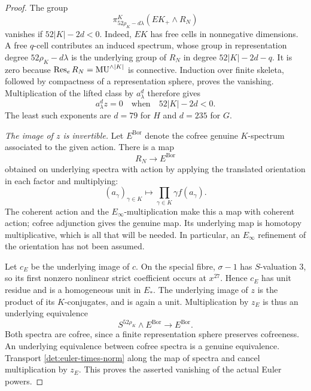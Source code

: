 \begin{proof}
The group
\[
 \pi_{52\rho_K-d\lambda}^K(EK_+\wedge R_N)
\]
vanishes if \(52|K|-2d<0\).
Indeed, \(EK\) has free cells in nonnegative dimensions.
A free \(q\)-cell contributes an induced spectrum, whose
group in representation degree \(52\rho_K-d\lambda\) is
the underlying group of \(R_N\) in degree
\(52|K|-2d-q\).  It is zero because
\(\operatorname{Res}_eR_N=\mathrm{MU}^{\wedge |K|}\) is connective.
Induction over finite skeleta, followed by compactness of a
representation sphere, proves the vanishing.
Multiplication of the lifted class by \(a_\lambda^d\)
therefore gives
\begin{equation}\label{det:euler-times-norm}
 a_\lambda^d z=0
 \quad\text{when}\quad 52|K|-2d<0.
\end{equation}
The least such exponents are \(d=79\) for \(H\) and
\(d=235\) for \(G\).

\emph{The image of \(z\) is invertible.}
Let \(E^{\mathrm{Bor}}\) denote the cofree genuine
\(K\)-spectrum associated to the given action.
There is a map
\[
 R_N\longrightarrow E^{\mathrm{Bor}}
\]
obtained on underlying spectra with action by applying the
translated orientation in each factor and multiplying:
\[
 (a_\gamma)_{\gamma\in K}\longmapsto
          \prod_{\gamma\in K}\gamma f(a_\gamma).
\]
The coherent action and the \(E_\infty\)-multiplication
make this a map with coherent action; cofree adjunction
gives the genuine map.
Its underlying map is homotopy multiplicative, which is
all that will be needed.  In particular, an \(E_\infty\)
refinement of the orientation has not been assumed.

Let \(c_E\) be the underlying image of \(c\).
On the special fibre, \(\sigma-1\) has \(S\)-valuation \(3\),
so its first nonzero nonlinear strict coefficient occurs
at \(x^{27}\).  Hence \(c_E\) has unit residue and is a
homogeneous unit in \(E_*\).
The underlying image of \(z\) is the product of its
\(K\)-conjugates, and is again a unit.
Multiplication by \(z_E\) is thus an underlying equivalence
\[
 S^{52\rho_K}\wedge E^{\mathrm{Bor}}
       \longrightarrow E^{\mathrm{Bor}}.
\]
Both spectra are cofree, since a finite representation
sphere preserves cofreeness.  An underlying equivalence
between cofree spectra is a genuine equivalence.
Transport \eqref{det:euler-times-norm} along the map of
spectra and cancel multiplication by \(z_E\).
This proves the asserted vanishing of the actual Euler
powers.


\end{proof}
